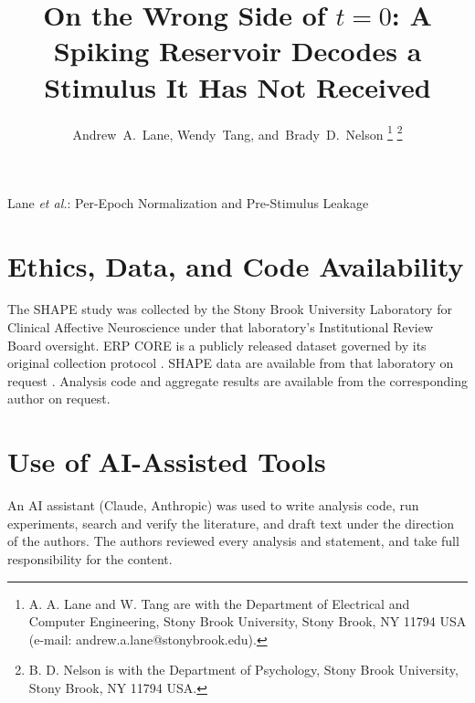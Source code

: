 \documentclass[journal]{IEEEtran}
\begin{document}
\title{On the Wrong Side of \texorpdfstring{$t=0$}{t = 0}: A Spiking Reservoir Decodes a Stimulus It Has Not Received}

\author{Andrew~A.~Lane,
        Wendy~Tang,
        and~Brady~D.~Nelson%
\thanks{A. A. Lane and W. Tang are with the Department of Electrical and Computer Engineering, Stony Brook University, Stony Brook, NY 11794 USA (e-mail: andrew.a.lane@stonybrook.edu).}%
\thanks{B. D. Nelson is with the Department of Psychology, Stony Brook University, Stony Brook, NY 11794 USA.}}

%
{Lane \MakeLowercase{\textit{et al.}}: Per-Epoch Normalization and Pre-Stimulus Leakage}

\maketitle








\section*{Ethics, Data, and Code Availability}
The SHAPE study was collected by the Stony Brook University Laboratory for Clinical Affective Neuroscience under that laboratory's Institutional Review Board oversight. ERP CORE is a publicly released dataset governed by its original collection protocol \cite{kappenman2021erpcore}.
SHAPE data are available from that laboratory on request \cite{shape}. Analysis code and aggregate results are available from the corresponding author on request.

\section*{Use of AI-Assisted Tools}
An AI assistant (Claude, Anthropic) was used to write analysis code, run experiments, search and verify the literature, and draft text under the direction of the authors. The authors reviewed every analysis and statement, and take full responsibility for the content.



\end{document}
